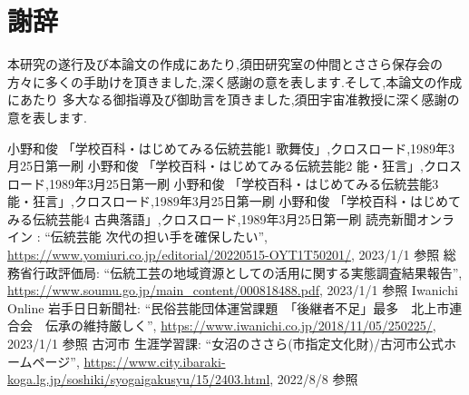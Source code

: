 \documentclass[12pt]{ltjsarticle}
\begin{document}
\section{謝辞}
本研究の遂行及び本論文の作成にあたり,須田研究室の仲間とささら保存会の方々に多くの手助けを頂きました,深く感謝の意を表します.そして,本論文の作成にあたり
多大なる御指導及び御助言を頂きました,須田宇宙准教授に深く感謝の意を表します.
\newpage
{}
\begin{thebibliography}{99}
 小野和俊 「学校百科・はじめてみる伝統芸能1 歌舞伎」,クロスロード,1989年3月25日第一刷
 小野和俊 「学校百科・はじめてみる伝統芸能2 能・狂言」,クロスロード,1989年3月25日第一刷
 小野和俊 「学校百科・はじめてみる伝統芸能3 能・狂言」,クロスロード,1989年3月25日第一刷
 小野和俊 「学校百科・はじめてみる伝統芸能4 古典落語」,クロスロード,1989年3月25日第一刷
 読売新聞オンライン : ``伝統芸能 次代の担い手を確保したい'', \url{https://www.yomiuri.co.jp/editorial/20220515-OYT1T50201/}, 2023/1/1 参照
 総務省行政評価局: ``伝統工芸の地域資源としての活用に関する実態調査結果報告'', \url{https://www.soumu.go.jp/main_content/000818488.pdf}, 2023/1/1 参照  
 Iwanichi Online 岩手日日新聞社: ``民俗芸能団体運営課題　「後継者不足」最多　北上市連合会　伝承の維持厳しく'', \url{https://www.iwanichi.co.jp/2018/11/05/250225/}, 2023/1/1 参照
 古河市 生涯学習課: ``女沼のささら(市指定文化財)/古河市公式ホームページ'', \url{https://www.city.ibaraki-koga.lg.jp/soshiki/syogaigakusyu/15/2403.html}, 2022/8/8 参照



\end{thebibliography}
\end{document}
